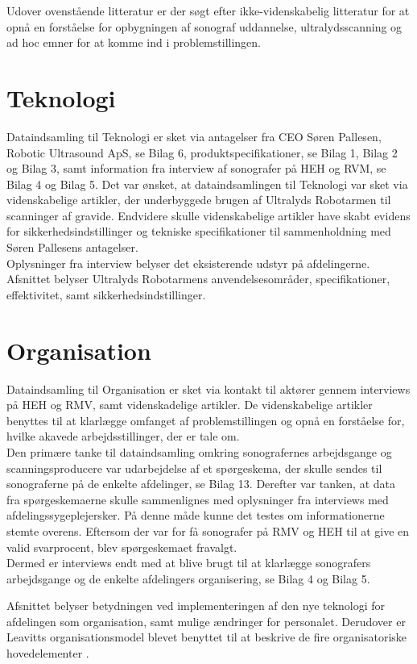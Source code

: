 Udover ovenstående litteratur er der søgt efter ikke-videnskabelig litteratur for at opnå en forståelse for opbygningen af sonograf uddannelse, ultralydsscanning og ad hoc emner for at komme ind i problemstillingen. 

\section{Teknologi}
Dataindsamling til Teknologi er sket via antagelser fra CEO Søren Pallesen, Robotic Ultrasound ApS, se Bilag 6, produktspecifikationer, se Bilag 1, Bilag 2 og Bilag 3, samt information fra interview af sonografer på HEH og RVM, se Bilag 4 og Bilag 5. Det var ønsket, at dataindsamlingen til Teknologi var sket via videnskabelige artikler, der underbyggede brugen af Ultralyds Robotarmen til scanninger af gravide.
Endvidere skulle videnskabelige artikler have skabt evidens for sikkerhedsindstillinger og tekniske specifikationer til sammenholdning med Søren Pallesens antagelser.\\
Oplysninger fra interview belyser det eksisterende udstyr på afdelingerne. Afsnittet belyser Ultralyds Robotarmens anvendelsesområder, specifikationer, effektivitet, samt sikkerhedsindstillinger.

\section{Organisation}
Dataindsamling til Organisation er sket via kontakt til aktører gennem interviews på HEH og RMV, samt videnskadelige artikler. De videnskabelige artikler benyttes til at klarlægge omfanget af problemstillingen og opnå en forståelse for, hvilke akavede arbejdsstillinger, der er tale om. \\
Den primære tanke til dataindsamling omkring sonografernes arbejdsgange og scanningsproducere var udarbejdelse af et spørgeskema, der skulle sendes til sonograferne på de enkelte afdelinger, se Bilag 13. Derefter var tanken, at data fra spørgeskemaerne skulle sammenlignes med oplysninger fra interviews med afdelingssygeplejersker. På denne måde kunne det testes om informationerne stemte overens. Eftersom der var for få sonografer på RMV og HEH til at give en valid svarprocent, blev spørgeskemaet fravalgt. \\
Dermed er interviews endt med at blive brugt til at klarlægge sonografers arbejdsgange og de enkelte afdelingers organisering, se Bilag 4 og Bilag 5. 

Afsnittet belyser betydningen ved implementeringen af den nye teknologi for afdelingen som organisation, samt mulige ændringer for personalet. Derudover er Leavitts organisationsmodel blevet benyttet til at beskrive de fire organisatoriske hovedelementer \cite{Leavitt}.

